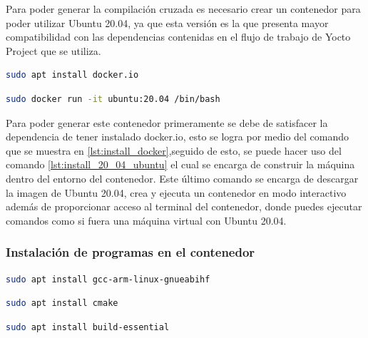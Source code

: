 Para poder generar la compilación cruzada es necesario crear un contenedor para poder utilizar Ubuntu 20.04, ya que esta versión es la que presenta mayor compatibilidad con las dependencias contenidas en el flujo de trabajo de Yocto Project que se utiliza. 


\begin{lstlisting}[language=bash, caption={Comando para la instalacion de docker}, label=lst:install_docker]
    sudo apt install docker.io
\end{lstlisting}

\begin{lstlisting}[language=bash, caption={Comando para la instalacion de Ubuntu 20.04}, label=lst:install_20_04_ubuntu]
    sudo docker run -it ubuntu:20.04 /bin/bash
\end{lstlisting}

Para poder generar este contenedor primeramente se debe de satisfacer la dependencia de tener instalado docker.io, esto se logra por medio del comando que se muestra en \ref{lst:install_docker},seguido de esto, se puede hacer uso del comando \ref{lst:install_20_04_ubuntu} el cual se encarga de construir la máquina dentro del entorno del contenedor. Este último comando se encarga de descargar la imagen de Ubuntu 20.04, crea y ejecuta un contenedor en modo interactivo además de proporcionar acceso al terminal del contenedor, donde puedes ejecutar comandos como si fuera una máquina virtual con Ubuntu 20.04.

\subsubsection{Instalación de programas en el contenedor}

\begin{lstlisting}[language=bash, caption={Comando para la instalacion del compilador cruzado}, label=lst:cross_compiler]
    sudo apt install gcc-arm-linux-gnueabihf
\end{lstlisting}

\begin{lstlisting}[language=bash, caption={Comando para la instalacion de CMake}, label=lst:cmake]
    sudo apt install cmake
\end{lstlisting}

\begin{lstlisting}[language=bash, caption={Comando para la instalacion de build essential}, label=lst:build_essential]
    sudo apt install build-essential
\end{lstlisting}

